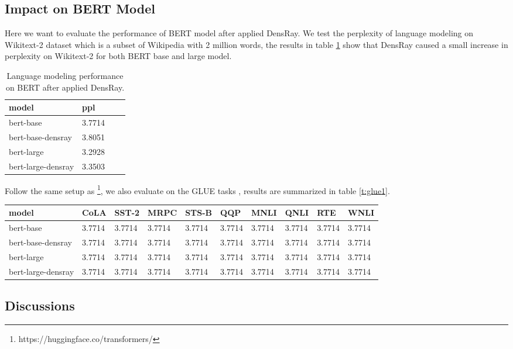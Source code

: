 \subsection{Impact on BERT Model}
Here we want to evaluate the performance of BERT model after applied DensRay. We test the perplexity of language modeling on Wikitext-2 dataset \citep{merity2016pointer} which is a subset of Wikipedia with 2 million words, the results in table \ref{t:ppl1} show that DensRay caused a small increase in perplexity on Wikitext-2 for both BERT base and large model.
\begin{table}[ht]
\centering
\begin{tabular}{llll}
\hline
model & ppl\\
\hline
bert-base & 3.7714\\
bert-base-densray & 3.8051\\
\hline
bert-large & 3.2928\\
bert-large-densray & 3.3503\\
\hline
\end{tabular}
\caption{\label{t:ppl1}
Language modeling performance on BERT after applied DensRay.}
\end{table}

Follow the same setup as \citet{wolf2019huggingfaces}\footnote{https://huggingface.co/transformers/}, we also evaluate on the GLUE tasks \citep{wang2018glue}, results are summarized in table \ref{t:glue1}. 
\begin{table*}[ht]
\centering
\begin{tabular}{llllllllll}
\hline
model & CoLA &SST-2&MRPC&STS-B&QQP&MNLI&QNLI&RTE&WNLI\\
\hline
bert-base & 3.7714& 3.7714& 3.7714& 3.7714& 3.7714& 3.7714& 3.7714& 3.7714& 3.7714\\
bert-base-densray & 3.7714& 3.7714& 3.7714& 3.7714& 3.7714& 3.7714& 3.7714& 3.7714& 3.7714\\
\hline
bert-large & 3.7714& 3.7714& 3.7714& 3.7714& 3.7714& 3.7714& 3.7714& 3.7714& 3.7714\\
bert-large-densray & 3.7714& 3.7714& 3.7714& 3.7714& 3.7714& 3.7714& 3.7714& 3.7714& 3.7714\\
\hline
\end{tabular}
\caption{\label{t:glue1}
GLUE tasks performance on BERT after applied DensRay.}
\end{table*}

\subsection{Discussions}
